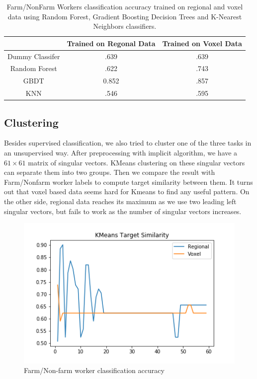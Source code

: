 \documentclass{article}[12pt]
\begin{document}
\begin{table} \centering

\begin{tabular}{|c|c|c|}
\hline
        & Trained on Regonal Data & Trained on Voxel Data \\ \hline
Dummy Classifer &.639        & .639              \\ \hline
Random Forest &.622           & .743              \\ \hline
GBDT         &0.852      & .857 \\ \hline
KNN        &.546     & .595 \\ \hline      
\end{tabular}

\caption{Farm/NonFarm Workers classification accuracy trained on regional and voxel data using Random Forest, Gradient Boosting Decision Trees and K-Nearest Neighbors classifiers.}
\end{table}


\subsection{Clustering}

Besides supervised classification, we also tried to cluster one of the three tasks in an unsupervised way. After preprocessing with implicit algorithm, we have a $61 \times 61$ matrix of singular vectors. KMeans clustering on these singular vectors can separate them into two groups. Then we compare the result with Farm/Nonfarm worker labels to compute target similarity between them. It turns out that voxel based data seems hard for Kmeans to find any useful pattern. On the other side, regional data reaches its maximum as we use two leading left singular vectors, but fails to work as the number of singular vectors increases.


\begin{figure}  \centering
\graphicspath{ {data/} }

\includegraphics[scale=0.5]{KMeans}
\caption{Farm/Non-farm worker classification accuracy}
\end{figure}
\end{document}
